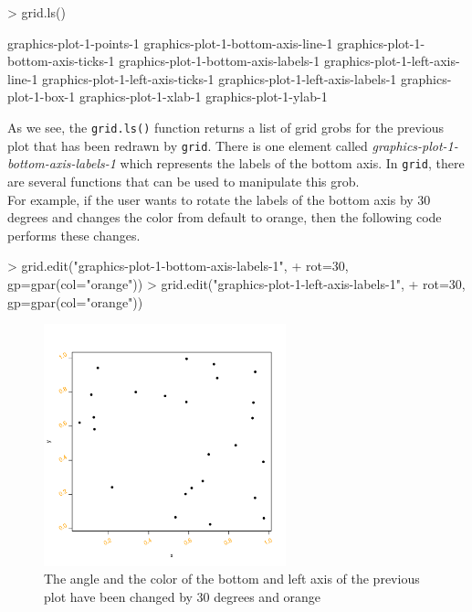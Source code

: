 \documentclass[paper=a4, fontsize=11pt]{report}
\begin{document}
\begin{Schunk}
\begin{Sinput}
> grid.ls()
\end{Sinput}
\begin{Soutput}
graphics-plot-1-points-1
graphics-plot-1-bottom-axis-line-1
graphics-plot-1-bottom-axis-ticks-1
graphics-plot-1-bottom-axis-labels-1
graphics-plot-1-left-axis-line-1
graphics-plot-1-left-axis-ticks-1
graphics-plot-1-left-axis-labels-1
graphics-plot-1-box-1
graphics-plot-1-xlab-1
graphics-plot-1-ylab-1
\end{Soutput}
\end{Schunk}


As we see, the \texttt{grid.ls()} function returns a list of grid grobs for the previous plot that has been redrawn by \texttt{grid}. There is one element called \textit{graphics-plot-1-bottom-axis-labels-1} which represents the labels of the bottom axis. In \texttt{grid}, there are several functions that can be used to manipulate this grob. \\

For example, if the user wants to rotate the labels of the bottom axis by 30 degrees and changes the color from default to orange, then the following code performs these changes.
\begin{Schunk}
\begin{Sinput}
> grid.edit("graphics-plot-1-bottom-axis-labels-1", 
+           rot=30, gp=gpar(col="orange"))
> grid.edit("graphics-plot-1-left-axis-labels-1", 
+           rot=30, gp=gpar(col="orange"))
\end{Sinput}
\end{Schunk}
\begin{figure}[h]
\begin{center}
  \includegraphics[height = 7cm, width = 7cm]{figure/report_basic_demo_4.pdf}
  \caption{The angle and the color of the bottom and left axis of the previous plot have been changed by 30 degrees and orange}
  	\label{figure3}
\end{center}
\end{figure}
\end{document}

